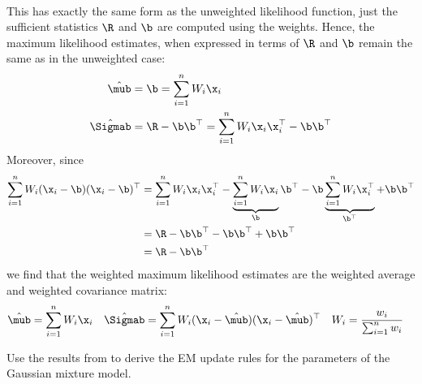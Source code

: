 \begin{exenumerate}
\begin{solution}
\begin{align}
     \end{align}
     This has exactly the same form as the unweighted likelihood function, just the
     sufficient statistics $\R$ and $\b$ are computed using the weights. Hence,
     the maximum likelihood estimates, when expressed in terms of $\R$ and $\b$
     remain the same as in the unweighted case:
     \begin{align}
       \hat{\mub} & = \b  =  \sum_{i=1}^n W_i\x_i\\
       \hat{\Sigmab} & = \R - \b\b^\top=  \sum_{i=1}^n W_i \x_i \x_i^\top - \b\b^\top
     \end{align}
     Moreover, since
     \begin{align}
       \sum_{i=1}^n W_i (\x_i-\b)(\x_i-\b)^\top  & =  \sum_{i=1}^n W_i \x_i \x_i^\top - \underbrace{\sum_{i=1}^n W_i \x_i}_{\b} \b^\top - \b \underbrace{\sum_{i=1}^n W_i \x_i^\top}_{\b^\top} + \b\b^\top\\
                                                 &=\R - \b \b^\top - \b \b^\top + \b\b^\top\\
                                                 & =  \R - \b\b^\top
     \end{align}
     we find that the weighted maximum likelihood estimates are the weighted
     average and weighted covariance matrix:
     \begin{align}
       \hat{\mub} & =   \sum_{i=1}^n W_i\x_i&  \hat{\Sigmab} &=    \sum_{i=1}^n W_i (\x_i-\hat{\mub})(\x_i-\hat{\mub})^\top & W_i&= \frac{w_i}{\sum_{i=1}^n w_i}
     \end{align}
  \end{solution}

  \item Use the results from   to derive the EM update
    rules for the parameters of the Gaussian mixture model.


\end{exenumerate}
